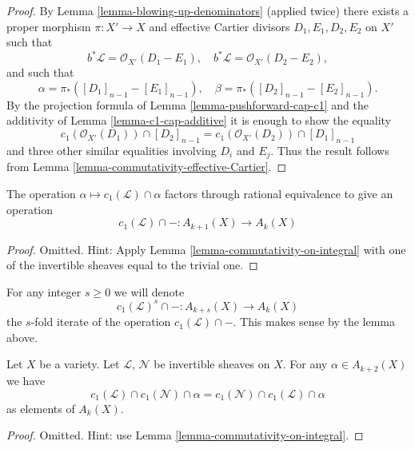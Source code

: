 \begin{proof}
By Lemma \ref{lemma-blowing-up-denominators} (applied twice)
there exists a proper morphism
$\pi : X' \to X$ and effective Cartier divisors
$D_1, E_1, D_2, E_2$ on $X'$ such that
$$
b^*\mathcal{L} = \mathcal{O}_{X'}(D_1 - E_1),
\quad
b^*\mathcal{L} = \mathcal{O}_{X'}(D_2 - E_2),
$$
and such that
$$
\alpha = \pi_*([D_1]_{n - 1} - [E_1]_{n - 1}),
\quad
\beta = \pi_*([D_2]_{n - 1} - [E_2]_{n - 1}).
$$
By the projection formula of Lemma \ref{lemma-pushforward-cap-c1}
and the additivity of Lemma \ref{lemma-c1-cap-additive}
it is enough to show the equality
$$
c_1(\mathcal{O}_{X'}(D_1)) \cap [D_2]_{n - 1}
=
c_1(\mathcal{O}_{X'}(D_2)) \cap [D_1]_{n - 1}
$$
and three other similar equalities involving $D_i$ and $E_j$.
Thus the result follows from Lemma \ref{lemma-commutativity-effective-Cartier}.
\end{proof}

\begin{lemma}
\label{lemma-factors}
The operation $\alpha \mapsto c_1(\mathcal{L}) \cap \alpha$
factors through rational equivalence to give an operation
$$
c_1(\mathcal{L}) \cap - :
A_{k + 1}(X) \to A_k(X)
$$
\end{lemma}

\begin{proof}
Omitted. Hint:
Apply Lemma \ref{lemma-commutativity-on-integral}
with one of the invertible sheaves equal to the
trivial one.
\end{proof}

\noindent
For any integer $s \geq 0$ we will denote
$$
c_1(\mathcal{L})^s \cap - : A_{k + s}(X) \to A_k(X)
$$
the $s$-fold iterate of the operation $c_1(\mathcal{L}) \cap - $.
This makes sense by the lemma above.

\begin{lemma}
\label{lemma-cap-commutative}
Let $X$ be a variety.
Let $\mathcal{L}$, $\mathcal{N}$ be invertible sheaves on $X$.
For any $\alpha \in A_{k + 2}(X)$ we have
$$
c_1(\mathcal{L}) \cap c_1(\mathcal{N}) \cap \alpha
=
c_1(\mathcal{N}) \cap c_1(\mathcal{L}) \cap \alpha
$$
as elements of $A_k(X)$.
\end{lemma}

\begin{proof}
Omitted. Hint: use Lemma \ref{lemma-commutativity-on-integral}.
\end{proof}









